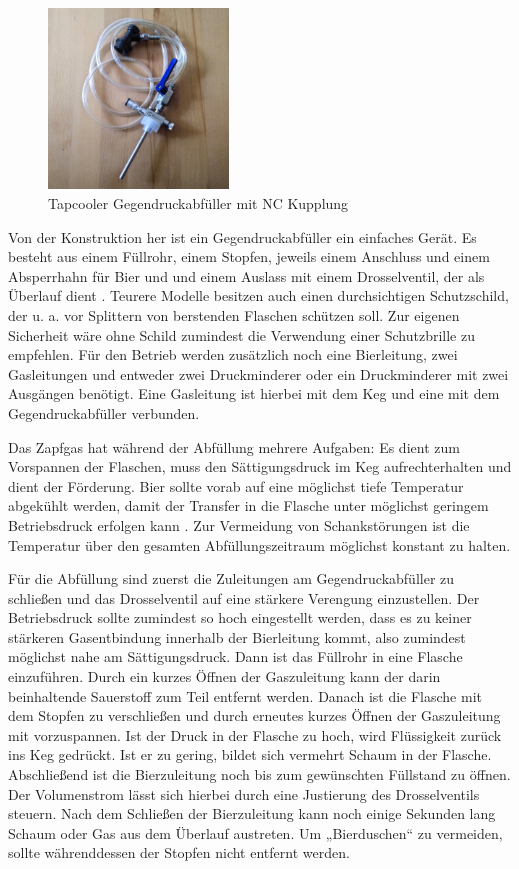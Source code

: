 \documentclass[a4paper,parskip=half]{scrartcl}
\begin{document}
\begin{figure}[h]
\centering
\includegraphics[width=4.8cm]{images/gegendruckabfuller.jpg}
\caption{Tapcooler Gegendruckabfüller mit NC Kupplung}
\label{fig:gegendruckabfuller}
\end{figure}

Von der Konstruktion her ist ein Gegendruckabfüller ein einfaches Gerät. Es besteht aus einem Füllrohr, einem Stopfen, jeweils einem Anschluss und einem Absperrhahn für Bier und  und einem Auslass mit einem Drosselventil, der als Überlauf dient \autocite{Gretzschel2016}. Teurere Modelle besitzen auch einen durchsichtigen Schutzschild, der u. a. vor Splittern von berstenden Flaschen schützen soll. Zur eigenen Sicherheit wäre ohne Schild zumindest die Verwendung einer Schutzbrille zu empfehlen. Für den Betrieb werden zusätzlich noch eine Bierleitung, zwei Gasleitungen und entweder zwei Druckminderer oder ein Druckminderer mit zwei Ausgängen benötigt. Eine Gasleitung ist hierbei mit dem Keg und eine mit dem Gegendruckabfüller verbunden.

Das Zapfgas hat während der Abfüllung mehrere Aufgaben: Es dient zum Vorspannen der Flaschen, muss den Sättigungsdruck im Keg aufrechterhalten und dient der Förderung. Bier sollte vorab auf eine möglichst tiefe Temperatur abgekühlt werden, damit der Transfer in die Flasche unter möglichst geringem Betriebsdruck erfolgen kann \autocite{Gretzschel2016}. Zur Vermeidung von Schankstörungen ist die Temperatur über den gesamten Abfüllungszeitraum möglichst konstant zu halten.

Für die Abfüllung sind zuerst die Zuleitungen am Gegendruckabfüller zu schließen und das Drosselventil auf eine stärkere Verengung einzustellen. Der Betriebsdruck sollte zumindest so hoch eingestellt werden, dass es zu keiner stärkeren Gasentbindung innerhalb der Bierleitung kommt, also zumindest möglichst nahe am Sättigungsdruck. Dann ist das Füllrohr in eine Flasche einzuführen. Durch ein kurzes Öffnen der Gaszuleitung kann der darin beinhaltende Sauerstoff zum Teil entfernt werden. Danach ist die Flasche mit dem Stopfen zu verschließen und durch erneutes kurzes Öffnen der Gaszuleitung mit  vorzuspannen. Ist der Druck in der Flasche zu hoch, wird Flüssigkeit zurück ins Keg gedrückt. Ist er zu gering, bildet sich vermehrt Schaum in der Flasche. Abschließend ist die Bierzuleitung noch bis zum gewünschten Füllstand zu öffnen. Der Volumenstrom lässt sich hierbei durch eine Justierung des Drosselventils steuern. Nach dem Schließen der Bierzuleitung kann noch einige Sekunden lang Schaum oder Gas aus dem Überlauf austreten. Um „Bierduschen“ zu vermeiden, sollte währenddessen der Stopfen nicht entfernt werden.
\end{document}
